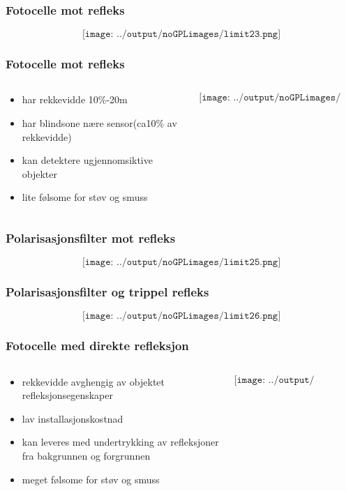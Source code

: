 \documentclass[aspectratio=169,xcolor=dvipsnames]{beamer}
\begin{document}
\begin{frame}
	\frametitle{Fotocelle mot refleks}
	$$\texttt{[image: ../output/noGPLimages/limit23.png]}$$
\end{frame}
\begin{frame}
	\frametitle{Fotocelle mot refleks}
	\begin{columns}
		\begin{column}{0.5\textwidth}
			\begin{itemize}
				\item har rekkevidde 10\%-20m
				\item har blindsone nære sensor(ca10\% av rekkevidde)
				\item kan detektere ugjennomsiktive objekter
				\item lite følsome for støv og smuss
			\end{itemize}

			
		\end{column}

		\begin{column}{0.5\textwidth}
	$$\texttt{[image: ../output/noGPLimages/limit24.png]}$$
		\end{column}
	\end{columns}
\end{frame}
\begin{frame}
	\frametitle{Polarisasjonsfilter mot refleks}
	$$\texttt{[image: ../output/noGPLimages/limit25.png]}$$
\end{frame}
\begin{frame}
	\frametitle{}
	\frametitle{Polarisasjonsfilter og trippel refleks}
	$$\texttt{[image: ../output/noGPLimages/limit26.png]}$$
\end{frame}
\begin{frame}
	\frametitle{Fotocelle med direkte refleksjon}
	\begin{columns}
		\begin{column}{0.5\textwidth}
			\begin{itemize}
				\item rekkevidde avghengig av objektet refleksjonsegenskaper
				\item lav installasjonskostnad
				\item kan leveres med undertrykking av refleksjoner fra bakgrunnen og forgrunnen
				\item meget følsome for støv og smuss
			\end{itemize}

			
		\end{column}

		\begin{column}{0.5\textwidth}
	$$\texttt{[image: ../output/noGPLimages/limit27.png]}$$
		\end{column}
	\end{columns}
\end{frame}
\end{document}
